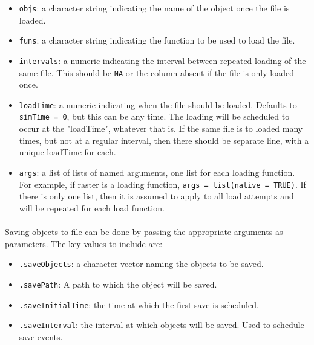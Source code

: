\documentclass{article}
\begin{document}
\begin{itemize}
  \item \texttt{objs}: a character string indicating the name of the object once the file is loaded.
  \item \texttt{funs}: a character string indicating the function to be used to load the file.
  \item \texttt{intervals}: a numeric indicating the interval between repeated loading of the same file. This should be \texttt{NA} or the column absent if the file is only loaded once.
  \item \texttt{loadTime}: a numeric indicating when the file should be loaded. Defaults to \texttt{simTime = 0}, but this can be any time. The loading will be scheduled to occur at the "loadTime", whatever that is. If the same file is to loaded many times, but not at a regular interval, then there should be separate line, with a unique loadTime for each.
  \item \texttt{args}: a list of lists of named arguments, one list for each loading function. For example, if raster is a loading function, \texttt{args = list(native = TRUE)}. If there is only one list, then it is assumed to apply to all load attempts and will be repeated for each load function.
\end{itemize}

\paragraph{}
Saving objects to file can be done by passing the appropriate arguments as parameters. The key values to include are:

\begin{itemize}
  \item \texttt{.saveObjects}: a character vector naming the objects to be saved.
  \item \texttt{.savePath}: A path to which the object will be saved.
  \item \texttt{.saveInitialTime}: the time at which the first save is scheduled.
  \item \texttt{.saveInterval}: the interval at which objects will be saved. Used to schedule save events.
\end{itemize}
\end{document}
